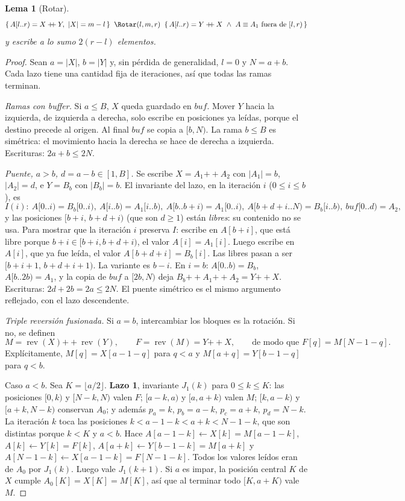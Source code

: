 \documentclass[10pt,a4paper]{article}
\theoremstyle{plain}
\newtheorem{lema}[teorema]{Lema}
\theoremstyle{definition}
\theoremstyle{remark}
\newcommand{\cat}{\mathbin{+\!\!+}}
\newcommand{\buf}{\mathit{buf}}
\newcommand{\Bsz}{B}
\newcommand{\rev}{\operatorname{rev}}
\newcommand{\hoare}[3]{\{\,#1\,\}\;\;#2\;\;\{\,#3\,\}}
\begin{document}
\begin{lema}[Rotar]\label{lem:rotar}
\[
\hoare{A[l..r)=X\cat Y,\ |X|=m-l}{\Rotar(l,m,r)}{A[l..r)=Y\cat X\ \wedge\ A\equiv A_1 \text{ fuera de } [l,r)}
\]
y escribe a lo sumo $2(r-l)$ elementos.
\end{lema}
\begin{proof}
Sean $a=|X|$, $b=|Y|$ y, sin pérdida de generalidad, $l=0$ y $N=a+b$. Cada lazo tiene
una cantidad fija de iteraciones, así que todas las ramas terminan.

\emph{Ramas con buffer.} Si $a\le\Bsz$, $X$ queda guardado en $\buf$. Mover $Y$ hacia
la izquierda, de izquierda a derecha, solo escribe en posiciones ya leídas, porque el
destino precede al origen. Al final $\buf$ se copia a $[b,N)$. La rama $b\le\Bsz$ es
simétrica: el movimiento hacia la derecha se hace de derecha a izquierda. Escrituras:
$2a+b\le 2N$.

\emph{Puente, $a>b$, $d=a-b\in[1,\Bsz]$.} Se escribe $X=A_1\cat A_2$ con $|A_1|=b$,
$|A_2|=d$, e $Y=B_b$ con $|B_b|=b$. El invariante del lazo, en la iteración $i$
($0\le i\le b$), es
\[
I(i):\ A[0..i)=B_b[0..i),\ A[i..b)=A_1[i..b),\ A[b..b{+}i)=A_1[0..i),\
A[b{+}d{+}i..N)=B_b[i..b),\ \buf[0..d)=A_2,
\]
y las posiciones $[b+i,\,b+d+i)$ (que son $d\ge 1$) están \emph{libres}: su contenido
no se usa. Para mostrar que la iteración $i$ preserva $I$: escribe en $A[b+i]$, que
está libre porque $b+i\in[b+i,b+d+i)$, el valor $A[i]=A_1[i]$. Luego escribe en
$A[i]$, que ya fue leída, el valor $A[b+d+i]=B_b[i]$. Las libres pasan a ser
$[b+i+1,\,b+d+i+1)$. La variante es $b-i$. En $i=b$:
$A[0..b)=B_b$, $A[b..2b)=A_1$, y la copia de $\buf$ a $[2b,N)$ deja
$B_b\cat A_1\cat A_2=Y\cat X$. Escrituras: $2d+2b=2a\le 2N$. El puente simétrico es
el mismo argumento reflejado, con el lazo descendente.

\emph{Triple reversión fusionada.} Si $a=b$, intercambiar los bloques es la rotación.
Si no, se definen
\[
M=\rev(X)\cat\rev(Y),\qquad F=\rev(M)=Y\cat X,\qquad\text{de modo que } F[q]=M[N-1-q].
\]
Explícitamente, $M[q]=X[a-1-q]$ para $q<a$ y $M[a+q]=Y[b-1-q]$ para $q<b$.

Caso $a<b$. Sea $K=\lfloor a/2\rfloor$. \textbf{Lazo 1}, invariante $J_1(k)$ para
$0\le k\le K$: las posiciones $[0,k)$ y $[N{-}k,N)$ valen $F$; $[a{-}k,a)$ y
$[a,a{+}k)$ valen $M$; $[k,a{-}k)$ y $[a{+}k,N{-}k)$ conservan $A_0$; y además
$p_a=k$, $p_b=a-k$, $p_c=a+k$, $p_d=N-k$. La iteración $k$ toca las posiciones
$k<a-1-k<a+k<N-1-k$, que son distintas porque $k<K$ y $a<b$. Hace
$A[a{-}1{-}k]\gets X[k]=M[a{-}1{-}k]$, $A[k]\gets Y[k]=F[k]$,
$A[a{+}k]\gets Y[b{-}1{-}k]=M[a{+}k]$ y $A[N{-}1{-}k]\gets X[a{-}1{-}k]=F[N{-}1{-}k]$.
Todos los valores leídos eran de $A_0$ por $J_1(k)$. Luego vale $J_1(k+1)$. Si $a$ es
impar, la posición central $K$ de $X$ cumple $A_0[K]=X[K]=M[K]$, así que al terminar
todo $[K,a+K)$ vale $M$.


\end{proof}
\end{document}
